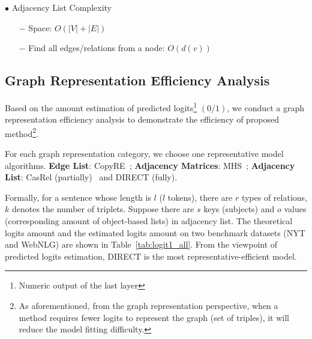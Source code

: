 \documentclass[11pt,a4paper]{article}
\begin{document}
$\bullet$  Adjacency List Complexity
    \begin{enumerate}
    	\item[$-$] Space: $O(|V|+|E|)$
        \item[$-$] Find all edges/relations from a node: $O(d(v))$
    \end{enumerate}

\subsection{Graph Representation Efficiency Analysis}\label{ass:gre}
Based on the amount estimation of predicted logits\footnote{Numeric output of the last layer} $(0/1)$, we conduct a graph representation efficiency analysis to demonstrate the efficiency of proposed method\footnote{As aforementioned, from the graph representation perspective, when a method requires fewer logits to represent the graph (set of triples), it will reduce the model fitting difficulty.}.

For each graph representation category, we choose one representative model algorithms. \textbf{Edge List}: CopyRE~\cite{zeng2018extracting}; \textbf{Adjacency Matrices}: MHS~\cite{bekoulis2018joint}; \textbf{Adjacency List}: CasRel (partially)~\cite{wei2020novel} and DIRECT (fully).

Formally, for a sentence whose length is $l$ ($l$ tokens), there are  $r$ types of relations, $k$ denotes the number of triplets. Suppose there are $s$ keys (subjects) and $o$ values (corresponding amount of  object-based lists) in adjacency list. The theoretical logits amount and the estimated logits amount on two benchmark datasets (NYT and WebNLG) are shown in Table~\ref{tab:logit1_all}. From the viewpoint of predicted logits estimation, DIRECT is the most representative-efficient model.



 
\end{document}
